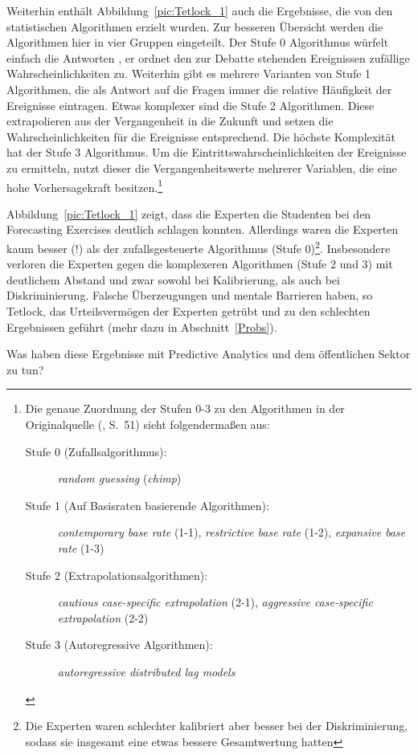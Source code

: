 Weiterhin enthält Abbildung~\ref{pic:Tetlock_1} auch die Ergebnisse, die von den
statistischen Algorithmen erzielt wurden. Zur besseren Übersicht werden die
Algorithmen hier in vier Gruppen eingeteilt. Der Stufe 0 Algorithmus würfelt
einfach die Antworten , er ordnet den zur Debatte stehenden Ereignissen
zufällige Wahrscheinlichkeiten zu. Weiterhin gibt es mehrere Varianten von
Stufe 1 Algorithmen, die als Antwort auf die Fragen immer die relative
Häufigkeit der Ereignisse eintragen. Etwas komplexer sind die Stufe 2
Algorithmen. Diese extrapolieren aus der Vergangenheit in die Zukunft und setzen
die Wahrscheinlichkeiten für die Ereignisse entsprechend. Die höchste
Komplexität hat der Stufe 3 Algorithmus. Um die Eintrittswahrscheinlichkeiten
der Ereignisse zu ermitteln, nutzt dieser die Vergangenheitswerte mehrerer
Variablen, die eine hohe Vorhersagekraft besitzen.\footnote{Die genaue Zuordnung
der Stufen 0-3 zu den Algorithmen in der Originalquelle (\cite{Tetlock}, S.~51)
sieht folgendermaßen aus:
\begin{description}
\item[Stufe 0 (Zufallsalgorithmus):] \emph{random guessing} (\emph{chimp})
\item[Stufe 1 (Auf Basisraten basierende Algorithmen):] 
  \emph{contemporary base rate} (1-1), \emph{restrictive base rate} (1-2),
  \emph{expansive base rate} (1-3)
\item[Stufe 2 (Extrapolationsalgorithmen):] \emph{cautious case-specific
  extrapolation} (2-1), \emph{aggressive case-specific extrapolation} (2-2)
\item[Stufe 3 (Autoregressive Algorithmen):] \emph{autoregressive distributed
  lag models}
\end{description}
} 

Abbildung~\ref{pic:Tetlock_1} zeigt, dass die Experten die Studenten bei
den Forecasting Exercises deutlich schlagen konnten. Allerdings waren die
Experten kaum besser (!) als der zufallsgesteuerte Algorithmus 
(Stufe 0)\footnote{Die Experten waren schlechter kalibriert aber besser bei
der Diskriminierung, sodass sie insgesamt eine etwas bessere Gesamtwertung
hatten}. Insbesondere verloren die Experten gegen die komplexeren Algorithmen
(Stufe 2 und 3) mit deutlichem Abstand und zwar sowohl bei Kalibrierung, als
auch bei Diskriminierung. Falsche Überzeugungen und mentale Barrieren haben, so
Tetlock, das Urteilsvermögen der Experten getrübt und zu den schlechten
Ergebnissen geführt (mehr dazu in Abschnitt~\ref{Probs}). 

Was haben diese Ergebnisse mit Predictive Analytics und dem öffentlichen
Sektor zu tun?

